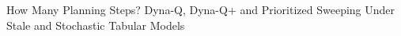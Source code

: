 How Many Planning Steps? Dyna-Q, Dyna-Q+ and Prioritized Sweeping Under Stale and Stochastic Tabular Models
